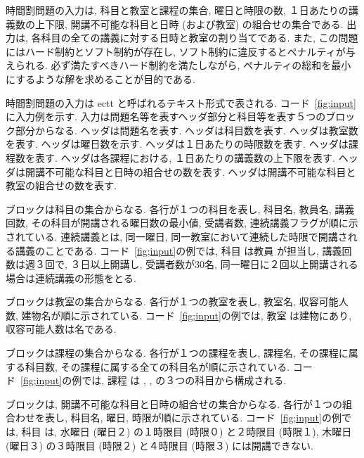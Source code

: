

時間割問題の入力は, 科目と教室と課程の集合, 曜日と時限の数, １日あたりの講義数の上下限, 開講不可能な科目と日時 (および教室) の組合せの集合である. 出力は, 各科目の全ての講義に対する日時と教室の割り当てである. また, この問題にはハード制約とソフト制約が存在し, ソフト制約に違反するとペナルティが与えられる. 必ず満たすべきハード制約を満たしながら, ペナルティの総和を最小にするような解を求めることが目的である.

時間割問題の入力は ectt と呼ばれるテキスト形式で表される. コード~\ref{fig;input}に入力例を示す. 入力は問題名等を表すヘッダ部分と科目等を表す５つのブロック部分からなる.  ヘッダは問題名を表す.  ヘッダは科目数を表す.  ヘッダは教室数を表す.  ヘッダは曜日数を示す.  ヘッダは１日あたりの時限数を表す.  ヘッダは課程数を表す.  ヘッダは各課程における, １日あたりの講義数の上下限を表す.  ヘッダは開講不可能な科目と日時の組合せの数を表す.  ヘッダは開講不可能な科目と教室の組合せの数を表す.

 ブロックは科目の集合からなる. 各行が１つの科目を表し, 科目名, 教員名, 講義回数, その科目が開講される曜日数の最小値, 受講者数, 連続講義フラグが順に示されている. 連続講義とは, 同一曜日, 同一教室において連続した時限で開講される講義のことである. コード~\ref{fig;input}の例では, 科目  は教員  が担当し, 講義回数は週３回で, ３日以上開講し, 受講者数が30名, 同一曜日に２回以上開講される場合は連続講義の形態をとる.

 ブロックは教室の集合からなる. 各行が１つの教室を表し, 教室名, 収容可能人数, 建物名が順に示されている. コード~\ref{fig;input}の例では, 教室  は建物にあり, 収容可能人数は名である.

 ブロックは課程の集合からなる. 各行が１つの課程を表し, 課程名, その課程に属する科目数, その課程に属する全ての科目名が順に示されている. コード~\ref{fig;input}の例では, 課程  は , ,  の３つの科目から構成される.

 ブロックは, 開講不可能な科目と日時の組合せの集合からなる. 各行が１つの組合わせを表し, 科目名, 曜日, 時限が順に示されている. コード~\ref{fig;input}の例では, 科目  は, 水曜日 (曜日２) の１時限目 (時限０) と２時限目 (時限１), 木曜日 (曜日３) の３時限目 (時限２) と４時限目 (時限３) には開講できない. 

